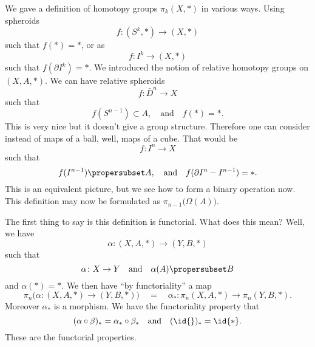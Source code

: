 
We gave a definition of homotopy groups $\pi_{k}(X,*)$ in various
ways. Using spheroids
\begin{equation}
f\colon(S^k,*)\to(X,*)
\end{equation}
such that $f(*)=*$, or as
\begin{equation}
f\colon I^k\to (X,*)
\end{equation}
such that $f(\partial I^k)=*$. We introduced the notion of
relative homotopy groups on $(X,A,*)$. We can have relative
spheroids
\begin{equation}
f\colon\bar{D}^{n}\to X
\end{equation}
such that
\begin{equation}
f(S^{n-1})\subset A,\quad\mbox{and}\quad f(*)=*.
\end{equation}
This is very nice but it doesn't give a group
structure. Therefore one can consider instead of maps of a ball,
well, maps of a cube. That would be
\begin{equation}
f\colon I^n\to X
\end{equation}
such that
\begin{equation}
f(I^{n-1})\propersubset A,\quad\mbox{and}\quad
f(\partial I^n-I^{n-1})=*.
\end{equation}
This is an equivalent picture, but we see how to form a binary
operation now. This definition may now be formulated as
$\pi_{n-1}\bigl(\Omega(A)\bigr)$.

The first thing to say is this definition is functorial. 
What does this mean? Well, we have 
\begin{equation}
\alpha\colon(X,A,*)\to(Y,B,*)
\end{equation}
such that
\begin{equation}
\alpha\colon X\to Y\quad\mbox{and}\quad \alpha(A)\propersubset B
\end{equation}
and $\alpha(*)=*$. We then have ``by functoriality'' a map
\begin{equation}
\pi_{n}\bigl(\alpha\colon(X,A,*)\to(Y,B,*)\bigr)\quad=\quad \alpha_{*}\colon
\pi_{n}(X,A,*)\to\pi_{n}(Y,B,*).
\end{equation}
Moreover $\alpha_{*}$ is a morphism. We have the functoriality
property that 
\begin{equation}
(\alpha\circ\beta)_{*}=\alpha_{*}\circ\beta_{*}\quad\mbox{and}\quad
(\id{})_{*}=\id{*}.
\end{equation}
These are the functorial properties.

